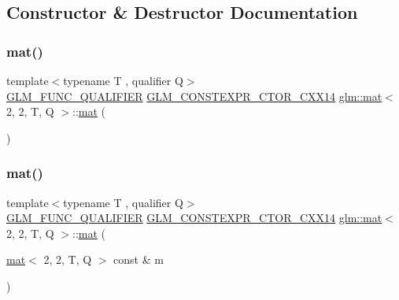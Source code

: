 \subsection{Constructor \& Destructor Documentation}
\mbox{\label{structglm_1_1mat_3_012_00_012_00_01_t_00_01_q_01_4_a8601499ee4cd49be39e8497bbef84d91}} 
\subsubsection{\texorpdfstring{mat()}{mat()}\hspace{0.1cm}{\footnotesize\ttfamily [1/21]}}
{\footnotesize\ttfamily template$<$typename T , qualifier Q$>$ \\
\hyperlink{setup_8hpp_a33fdea6f91c5f834105f7415e2a64407}{G\+L\+M\+\_\+\+F\+U\+N\+C\+\_\+\+Q\+U\+A\+L\+I\+F\+I\+ER} \hyperlink{setup_8hpp_a0900f9145e68bf6061b6f5e7be3fa751}{G\+L\+M\+\_\+\+C\+O\+N\+S\+T\+E\+X\+P\+R\+\_\+\+C\+T\+O\+R\+\_\+\+C\+X\+X14} \hyperlink{structglm_1_1mat}{glm\+::mat}$<$ 2, 2, T, Q $>$\+::\hyperlink{structglm_1_1mat}{mat} (\begin{DoxyParamCaption}{ }\end{DoxyParamCaption})}

\mbox{\label{structglm_1_1mat_3_012_00_012_00_01_t_00_01_q_01_4_aa45ca90831c32104d9c29f84ec0b9dac}} 
\subsubsection{\texorpdfstring{mat()}{mat()}\hspace{0.1cm}{\footnotesize\ttfamily [2/21]}}
{\footnotesize\ttfamily template$<$typename T , qualifier Q$>$ \\
\hyperlink{setup_8hpp_a33fdea6f91c5f834105f7415e2a64407}{G\+L\+M\+\_\+\+F\+U\+N\+C\+\_\+\+Q\+U\+A\+L\+I\+F\+I\+ER} \hyperlink{setup_8hpp_a0900f9145e68bf6061b6f5e7be3fa751}{G\+L\+M\+\_\+\+C\+O\+N\+S\+T\+E\+X\+P\+R\+\_\+\+C\+T\+O\+R\+\_\+\+C\+X\+X14} \hyperlink{structglm_1_1mat}{glm\+::mat}$<$ 2, 2, T, Q $>$\+::\hyperlink{structglm_1_1mat}{mat} (\begin{DoxyParamCaption}\item[{\hyperlink{structglm_1_1mat}{mat}$<$ 2, 2, T, Q $>$ const \&}]{m }\end{DoxyParamCaption})}

